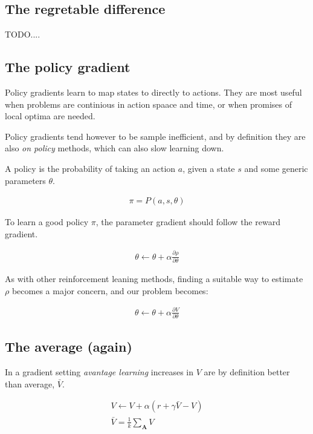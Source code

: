\documentclass[8pt]{article}
\begin{document}
\begin{multicols}{4}
\subsection*{The regretable difference}

TODO....


\vfill\null
\columnbreak
\subsection*{The policy gradient}
Policy gradients learn to map states to directly to actions. They are most useful when problems are continious in action spaace and time, or when promises of local optima are needed.  

Policy gradients tend however to be sample inefficient, and by definition they are also \emph{on policy} methods, which can also slow learning down.

A policy is the probability of taking an action $a$, given a state $s$ and some generic parameters $\theta$.

\begin{eqnarray}
\pi = P(a, s, \theta)
\end{eqnarray}

To learn a good policy $\pi$, the parameter gradient should follow the reward gradient. 

\begin{eqnarray}
\theta \leftarrow \theta + \alpha \frac{\partial \rho}{\partial \theta}
\end{eqnarray}

As with other reinforcement leaning methods, finding a suitable way to estimate $\rho$ becomes a major concern, and our problem becomes:

\begin{eqnarray}
\theta \leftarrow \theta + \alpha \frac{\partial V}{\partial \theta}
\label{eq:grad}
\end{eqnarray}

\subsection*{The average (again)}
In a gradient setting \emph{avantage learning} increases in $V$ are by definition better than average, $\bar{V}$.

\begin{eqnarray}
    V \leftarrow V + \alpha (r + \gamma \bar{V} - V) \\
    \bar{V} = \frac{1}{k} \sum_\textbf{A}{V} 
\end{eqnarray}


\end{multicols}
\end{document}
